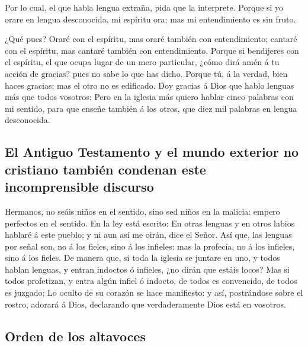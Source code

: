  Por lo cual, el que habla lengua extraña, pida que la
interprete.  Porque si yo orare en lengua desconocida, mi
espíritu ora; mas mi entendimiento es sin fruto.

 ¿Qué pues? Oraré con el espíritu, mas oraré también con
entendimiento; cantaré con el espíritu, mas cantaré también con
entendimiento.  Porque si bendijeres con el espíritu, el
que ocupa lugar de un mero particular, ¿cómo dirá amén á tu acción de
gracias? pues no sabe lo que has dicho.  Porque tú, á la
verdad, bien haces gracias; mas el otro no es edificado. 
Doy gracias á Dios que hablo lenguas más que todos vosotros:
 Pero en la iglesia más quiero hablar cinco palabras con mi
sentido, para que enseñe también á los otros, que diez mil palabras en
lengua desconocida.

\hypertarget{el-antiguo-testamento-y-el-mundo-exterior-no-cristiano-tambiuxe9n-condenan-este-incomprensible-discurso}{%
\subsection{El Antiguo Testamento y el mundo exterior no cristiano
también condenan este incomprensible
discurso}\label{el-antiguo-testamento-y-el-mundo-exterior-no-cristiano-tambiuxe9n-condenan-este-incomprensible-discurso}}

 Hermanos, no seáis niños en el sentido, sino sed niños en
la malicia: empero perfectos en el sentido.  En la ley está
escrito: En otras lenguas y en otros labios hablaré á este pueblo; y ni
aun así me oirán, dice el Señor.  Así que, las lenguas por
señal son, no á los fieles, sino á los infieles: mas la profecía, no á
los infieles, sino á los fieles.  De manera que, si toda la
iglesia se juntare en uno, y todos hablan lenguas, y entran indoctos ó
infieles, ¿no dirán que estáis locos?  Mas si todos
profetizan, y entra algún infiel ó indocto, de todos es convencido, de
todos es juzgado;  Lo oculto de su corazón se hace
manifiesto: y así, postrándose sobre el rostro, adorará á Dios,
declarando que verdaderamente Dios está en vosotros.

\hypertarget{orden-de-los-altavoces}{%
\subsection{Orden de los altavoces}\label{orden-de-los-altavoces}}

